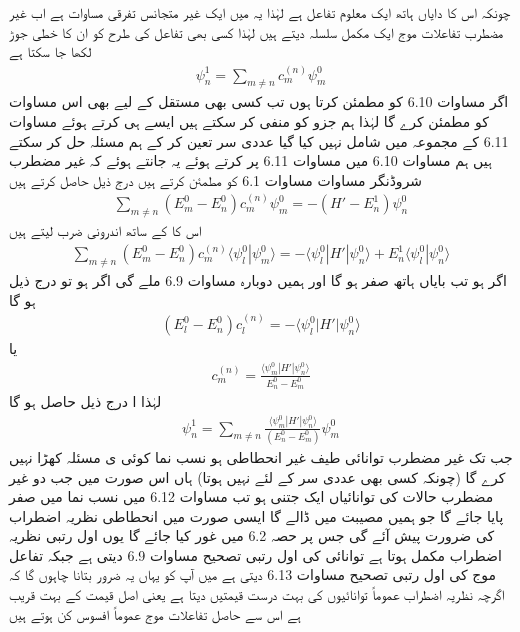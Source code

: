 چونکہ اس کا دایاں ہاتھ ایک معلوم تفاعل ہے لہٰذا یہ  میں ایک غیر  متجانس  تفرقی مساوات ہے اب غیر مضطرب تفاعلات موج ایک مکمل سلسلہ دیتے ہیں  لہٰذا  کسی بھی تفاعل کی طرح  کو ان کا خطی جوڑ لکھا جا سکتا ہے 
\begin{align}
\psi_n^1 = \sum_{m \ne n} c_m^{(n)} \psi_m^0
\end{align}
اگر  مساوات 6.10 کو مطمئن کرتا ہوں تب کسی بھی مستقل  کے لیے  بھی اس مساوات کو مطمئن کرے گا  لہٰذا  ہم جزو  کو منفی کر سکتے ہیں ایسے ہی کرتے ہوئے مساوات 6.11 کے مجموعہ میں  شامل نہیں کیا گیا عددی سر  تعین کر کے ہم مسئلہ حل کر سکتے ہیں ہم مساوات 6.10 میں مساوات 6.11 پر کرتے ہوئے یہ جانتے ہوئے کہ غیر مضطرب شروڈنگر  مساوات مساوات 6.1 کو  مطمئن کرتے ہیں درج ذیل حاصل کرتے ہیں 
\begin{align*}
\sum_{m \ne n} {(E_m^0 - E_n^0) c_m^{(n)} \psi_m^0} = - {(H' - E_n^1) \psi_n^0}
\end{align*}
اس کا  کے ساتھ اندرونی ضرب لیتے ہیں 
\begin{align*}
\sum_{m \ne n} (E_m^0 - E_n^0) c_m^{(n)} \langle \psi_l^0 | \psi_m^0 \rangle = - \langle \psi_l^0 | H' | \psi_n^0 \rangle + E_n^1 \langle \psi_l^0 | \psi_n^0 \rangle 
\end{align*}
اگر  ہو تب بایاں ہاتھ صفر ہو گا اور ہمیں دوبارہ مساوات 6.9 ملے گی اگر  ہو تو درج ذیل ہو گا 
\begin{align*}
(E_l^0 - E_n^0) c_l^{(n)} = - \langle \psi_l^0 | H' | \psi_n^0 \rangle
\end{align*}
یا 
\begin{align}
c_m^{(n)} = \frac{\langle \psi_m^0 | H' | \psi_n^0 \rangle}{E_n^0 - E_m^0}
\end{align}
 لہٰذا ا درج ذیل حاصل ہو گا 
\begin{align}
\psi_n^1 = \sum_{m \ne n} \frac{\langle \psi_m^0 | H' | \psi_n^0 \rangle}{(E_n^0 - E_m^0)} \psi_m^0
\end{align}
جب تک غیر مضطرب توانائی طیف غیر انحطاطی ہو  نسب نما  کوئی ی مسئلہ کھڑا نہیں کرے گا  (چونکہ کسی بھی عددی سر کے لئے   نہیں ہوتا) ہاں اس صورت میں جب دو غیر مضطرب حالات کی توانائیاں ایک  جتنی ہو تب مساوات 6.12 میں نسب نما میں صفر پایا جائے گا جو ہمیں مصیبت میں ڈالے گا ایسی صورت میں انحطاطی نظریہ اضطراب کی ضرورت پیش آئے گی جس پر حصہ 6.2 میں غور کیا جائے گا یوں اول رتبی  نظریہ اضطراب مکمل ہوتا ہے توانائی کی اول رتبی تصحیح  مساوات 6.9 دیتی ہے جبکہ تفاعل موج کی اول رتبی  تصحیح  مساوات 6.13 دیتی ہے میں آپ کو یہاں یہ ضرور بتانا چاہوں گا کہ اگرچہ نظریہ اضطراب عموماً  توانائیوں کی بہت درست قیمتیں دیتا ہے یعنی  اصل قیمت  کے بہت قریب ہے اس سے حاصل تفاعلات موج عموماً   افسوس  کن  ہوتے ہیں  

